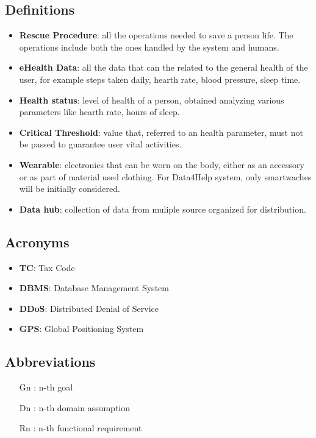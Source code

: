 \subsection{Definitions}
\begin{itemize}
\item \textbf{Rescue Procedure}: all the operations needed to save a person life. The operations include both the ones handled by the system and humans.
\item \textbf{eHealth Data}: all the data that can the related to the general health of the user, for example steps taken daily, hearth rate, blood pressure, sleep time.
\item \textbf{Health status}: level of health of a person, obtained analyzing various parameters like  hearth rate, hours of sleep.
\item \textbf{Critical Threshold}: value that, referred to an health parameter, must not be passed to guarantee user vital activities.
\item \textbf{Wearable}: electronics that can be worn on the body, either as an accessory or as part of material used clothing. For Data4Help system, only smartwaches will be initially considered.
\item \textbf{Data hub}: collection of data from muliple source organized for distribution.
\end{itemize}




\subsection{Acronyms}

\begin{itemize}
\item \textbf{TC}: Tax Code
\item \textbf{DBMS}: Database Management System
\item \textbf{DDoS}: Distributed Denial of Service
\item \textbf{GPS}: Global Positioning System
\end{itemize}

\subsection{Abbreviations}
\begin{itemize}
\item[Gn]: n-th goal
\item[Dn]: n-th domain assumption
\item[Rn]: n-th functional requirement
\end{itemize}



